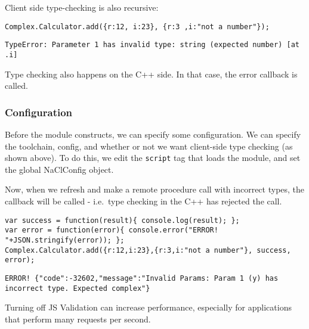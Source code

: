 Client side type-checking is also recursive:

\begin{verbatim}
Complex.Calculator.add({r:12, i:23}, {r:3 ,i:"not a number"});
\end{verbatim}

\begin{verbatim}
TypeError: Parameter 1 has invalid type: string (expected number) [at .i]
\end{verbatim}

Type checking also happens on the C++ side. In that case, the error
callback is called.

\subsubsection{Configuration}\label{configuration}

Before the module constructs, we can specify some configuration. We can
specify the toolchain, config, and whether or not we want client-side
type checking (as shown above). To do this, we edit the \texttt{script}
tag that loads the module, and set the global NaClConfig object.

\begin{Shaded}
\begin{Highlighting}[]
 \NormalTok{= \{}
  \NormalTok{: } 
\NormalTok{\};}
\NormalTok{\});}
\end{Highlighting}
\end{Shaded}

Now, when we refresh and make a remote procedure call with incorrect
types, the callback will be called - i.e.~type checking in the C++ has
rejected the call.

\begin{verbatim}
var success = function(result){ console.log(result); };
var error = function(error){ console.error("ERROR! "+JSON.stringify(error)); };
Complex.Calculator.add({r:12,i:23},{r:3,i:"not a number"}, success, error);
\end{verbatim}

\begin{verbatim}
ERROR! {"code":-32602,"message":"Invalid Params: Param 1 (y) has incorrect type. Expected complex"}
\end{verbatim}

Turning off JS Validation can increase performance, especially for
applications that perform many requests per second.

